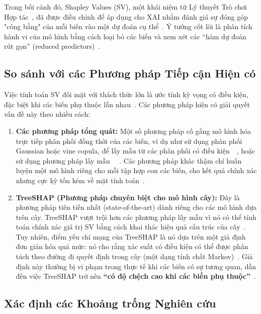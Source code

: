 \documentclass[12pt, a4paper]{article}
\theoremstyle{plain}
\theoremstyle{proposition}
\theoremstyle{lemma}
\begin{document}
Trong bối cảnh đó, Shapley Values (SV), một khái niệm từ Lý thuyết Trò chơi Hợp tác~\citep{Shapley1953}, đã được điều chỉnh để áp dụng cho XAI nhằm đánh giá sự đóng góp "công bằng" của mỗi biến vào một dự đoán cụ thể~\citep{lundberg2020local2global}. Ý tưởng cốt lõi là phân tích hành vi của mô hình bằng cách loại bỏ các biến và xem xét các ``hàm dự đoán rút gọn'' (reduced predictors)~\citep{Covert2020}.

\subsection{So sánh với các Phương pháp Tiếp cận Hiện có}

Việc tính toán SV đối mặt với thách thức lớn là ước tính kỳ vọng có điều kiện, đặc biệt khi các biến phụ thuộc lẫn nhau~\citep{aas2020explaining}. Các phương pháp hiện có giải quyết vấn đề này theo nhiều cách:

\begin{enumerate}
    \item \textbf{Các phương pháp tổng quát:} Một số phương pháp cố gắng mô hình hóa trực tiếp phân phối đồng thời của các biến, ví dụ như sử dụng phân phối Gaussian hoặc vine copula, để lấy mẫu từ các phân phối có điều kiện~\citep{aas2020explaining}~\citep{aas2021explaining}, hoặc sử dụng phương pháp lấy mẫu ~\citep{lundberg2020local2global}~\citep{improvingkernelCovert}. Các phương pháp khác thậm chí huấn luyện một mô hình riêng cho mỗi tập hợp con các biến, cho kết quả chính xác nhưng cực kỳ tốn kém về mặt tính toán~\citep{williamson2020efficient}.

    \item \textbf{TreeSHAP (Phương pháp chuyên biệt cho mô hình cây):} Đây là phương pháp tiên tiến nhất (state-of-the-art) dành riêng cho các mô hình dựa trên cây. TreeSHAP vượt trội hơn các phương pháp lấy mẫu vì nó có thể tính toán chính xác giá trị SV bằng cách khai thác hiệu quả cấu trúc của cây~\citep{lundberg2020local2global}. Tuy nhiên, điểm yếu chí mạng của TreeSHAP là nó dựa trên một giả định đơn giản hóa quá mức: nó cho rằng xác suất có điều kiện có thể được phân tách theo đường đi quyết định trong cây (một dạng tính chất Markov)~\citep{aas2020explaining}. Giả định này thường bị vi phạm trong thực tế khi các biến có sự tương quan, dẫn đến việc TreeSHAP trở nên \textbf{``có độ chệch cao khi các biến phụ thuộc''}~\citep{aas2020explaining}.
\end{enumerate}

\subsection{Xác định các Khoảng trống Nghiên cứu}
\end{document}
